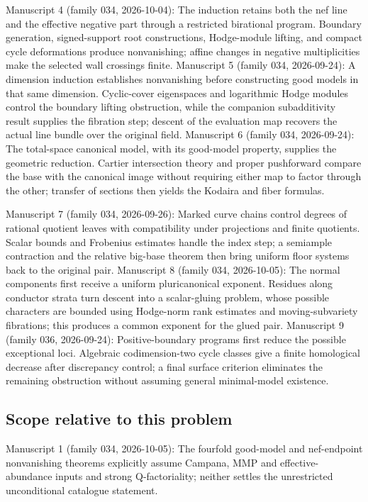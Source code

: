 \documentclass[11pt]{article}
\begin{document}
Manuscript 4 (family 034, 2026-10-04): The induction retains both the nef line and the effective negative part through a restricted birational program. Boundary generation, signed-support root constructions, Hodge-module lifting, and compact cycle deformations produce nonvanishing; affine changes in negative multiplicities make the selected wall crossings finite. Manuscript 5 (family 034, 2026-09-24): A dimension induction establishes nonvanishing before constructing good models in that same dimension. Cyclic-cover eigenspaces and logarithmic Hodge modules control the boundary lifting obstruction, while the companion subadditivity result supplies the fibration step; descent of the evaluation map recovers the actual line bundle over the original field. Manuscript 6 (family 034, 2026-09-24): The total-space canonical model, with its good-model property, supplies the geometric reduction. Cartier intersection theory and proper pushforward compare the base with the canonical image without requiring either map to factor through the other; transfer of sections then yields the Kodaira and fiber formulas.

Manuscript 7 (family 034, 2026-09-26): Marked curve chains control degrees of rational quotient leaves with compatibility under projections and finite quotients. Scalar bounds and Frobenius estimates handle the index step; a semiample contraction and the relative big-base theorem then bring uniform floor systems back to the original pair. Manuscript 8 (family 034, 2026-10-05): The normal components first receive a uniform pluricanonical exponent. Residues along conductor strata turn descent into a scalar-gluing problem, whose possible characters are bounded using Hodge-norm rank estimates and moving-subvariety fibrations; this produces a common exponent for the glued pair. Manuscript 9 (family 036, 2026-09-24): Positive-boundary programs first reduce the possible exceptional loci. Algebraic codimension-two cycle classes give a finite homological decrease after discrepancy control; a final surface criterion eliminates the remaining obstruction without assuming general minimal-model existence.

\subsection{Scope relative to this problem}
Manuscript 1 (family 034, 2026-10-05): The fourfold good-model and nef-endpoint nonvanishing theorems explicitly assume Campana, MMP and effective-abundance inputs and strong Q-factoriality; neither settles the unrestricted unconditional catalogue statement.
\end{document}
